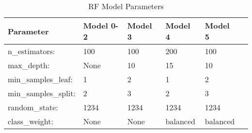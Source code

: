 
\begin{table}[H]
\centering
\caption{RF Model Parameters}
\label{tab:rf-parameters}
\begin{tabular}{llllll}
\hline
Parameter & Model 0-2 & Model 3 & Model 4 & Model 5\\ \hline
n\_estimators: & 100 & 100 & 200 & 100\\
max\_depth: & None & 10 & 15 & 10  \\
min\_samples\_leaf: & 1 & 2 & 1 & 2 \\
min\_samples\_split: & 2 & 3 & 2 & 3 \\
random\_state: & 1234 & 1234 & 1234 & 1234 \\
class\_weight: & None & None & balanced & balanced \\ \hline
\end{tabular}
\end{table}



%
